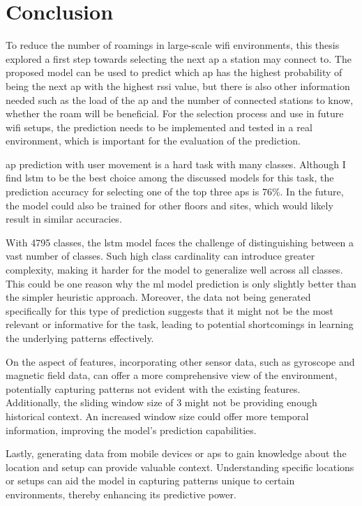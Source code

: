 \chapter{Conclusion}\label{ch:conclusion}
 
To reduce the number of roamings in large-scale \ac{wifi} environments, this thesis explored a first step towards selecting the next \ac{ap} a station may connect to.
The proposed model can be used to predict which \ac{ap} has the highest probability of being the next \ac{ap} with the highest \ac{rssi} value, but there is also other information needed such as the load of the \ac{ap} and the number of connected stations to know, whether the roam will be beneficial.
For the selection process and use in future \ac{wifi} setups, the prediction needs to be implemented and tested in a real environment, which is important for the evaluation of the prediction.

\ac{ap} prediction with user movement is a hard task with many classes.
Although I find \ac{lstm} to be the best choice among the discussed models for this task, the prediction accuracy for selecting one of the top three \acp{ap} is 76\%.
In the future, the model could also be trained for other floors and sites, which would likely result in similar accuracies.

With 4795 classes, the \ac{lstm} model faces the challenge of distinguishing between a vast number of classes.
Such high class cardinality can introduce greater complexity, making it harder for the model to generalize well across all classes.
This could be one reason why the \ac{ml} model prediction is only slightly better than the simpler heuristic approach.
Moreover, the data not being generated specifically for this type of prediction suggests that it might not be the most relevant or informative for the task, leading to potential shortcomings in learning the underlying patterns effectively.

On the aspect of features, incorporating other sensor data, such as gyroscope and magnetic field data, can offer a more comprehensive view of the environment, potentially capturing patterns not evident with the existing features.
Additionally, the sliding window size of 3 might not be providing enough historical context. An increased window size could offer more temporal information, improving the model's prediction capabilities.

Lastly, generating data from mobile devices or \acp{ap} to gain knowledge about the location and setup can provide valuable context.
Understanding specific locations or setups can aid the model in capturing patterns unique to certain environments, thereby enhancing its predictive power.
